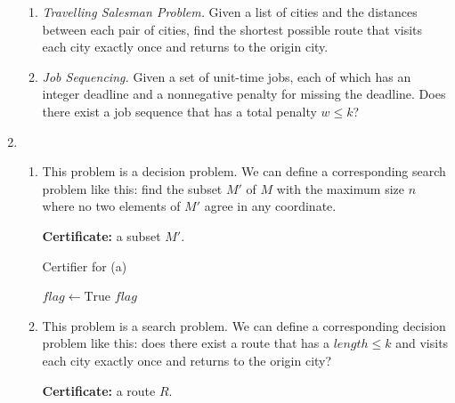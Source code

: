 \documentclass[12pt,a4paper]{article}
\makeatletter
\newtheorem*{solution}{Solution}
\theoremstyle{definition}
\renewenvironment{solution}[1][Solution] {\par\pushQED{\qed}\normalfont\topsep6\p@\@plus6\p@\relax\trivlist\item[\hskip\labelsep\bfseries#1\@addpunct{.}]\ignorespaces}{\popQED\endtrivlist\@endpefalse} \makeatother
\makeatother
\begin{document}
\begin{enumerate}
\begin{enumerate}
	    \item 
	    \textit{Travelling Salesman Problem.} Given a list of cities and the distances between each pair of cities, find the shortest possible route that visits each city exactly once and returns to the origin city.
	    
	    \item
	    \textit{Job Sequencing.} Given a set of unit-time jobs, each of which has an integer deadline and a nonnegative penalty for missing the deadline. Does there exist a job sequence that has a total penalty $w\leqslant k$?
	    
	\end{enumerate}
	\begin{solution}
	~
	\begin{enumerate}
	    \item 
	    This problem is a decision problem. We can define a corresponding search problem like this: find the subset $M'$ of $M$ with the maximum size $n$ where no two elements of $M'$ agree in any coordinate.
	    
	    \textbf{Certificate:} a subset $M'$.
	    
	    \begin{minipage}[t]{0.85\textwidth}         \begin{algorithm}[H]         
	    \BlankLine         
	    \caption{Certifier for (a)}
	    \label{Alg-certifier-a}
	    $flag\leftarrow\text{True}$\;
	    \Return $flag$\;
	    \end{algorithm}         
	    \end{minipage}
	    \item
	    This problem is a search problem. We can define a corresponding decision problem like this: does there exist a route that has  a $length\le k$ and visits each city exactly once and returns to the origin city?
	    
	     \textbf{Certificate:} a route $R$.
	     

\end{enumerate}
\end{solution}
\end{enumerate}
\end{document}
